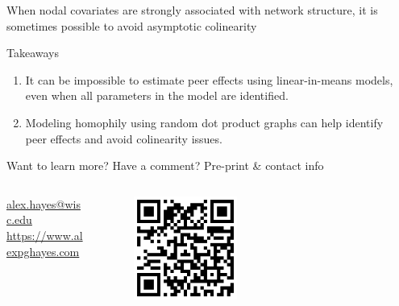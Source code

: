 \documentclass[final]{beamer}
\newlength{\sepwidth}
\newlength{\colwidth}
\newcommand{\separatorcolumn}{\begin{column}{\sepwidth}\end{column}}
\begin{document}
\begin{frame}[t]
\begin{columns}[t]
\begin{column}{\colwidth}
\begin{block}{When nodal covariates are strongly associated with network structure, it is sometimes possible to avoid asymptotic colinearity}
            \end{block}

            \begin{alertblock}{Takeaways}
                \vspace{4mm}
                \begin{enumerate}
                    \setlength\itemsep{1.5em}
                    \item It can be impossible to estimate peer effects using linear-in-means models, even when all parameters in the model are identified.
                    \item Modeling homophily using random dot product graphs can help identify peer effects and avoid colinearity issues.
                \end{enumerate}
            \end{alertblock}

            \begin{block}{Want to learn more? Have a comment? Pre-print \& contact info}
                \nocite{hayes2024c}
                \printbibliography
                \begin{columns}
                    \begin{column}{0.4\textwidth}
                        \begin{center}
                            \url{alex.hayes@wisc.edu} \\
                            \url{https://www.alexpghayes.com}
                        \end{center}
                    \end{column}
                    \begin{column}{0.3\textwidth}
                        \begin{figure}
                            \centering
                            \includegraphics[width=0.45\textwidth]{./figures/arxiv-qr.png}
                        \end{figure}
                    \end{column}
                \end{columns}
            \end{block}
        \end{column}
        \separatorcolumn
    \end{columns}
\end{frame}
\end{document}
